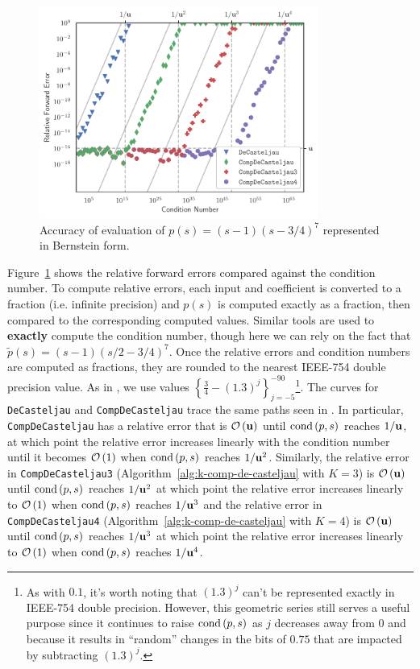 \begin{figure}
  \includegraphics[width=0.8125\textwidth]
                  {../images/k-compensated/de_casteljau_rel_error.pdf}
  \centering
  \captionsetup{width=.75\linewidth}
  \caption{Accuracy of evaluation of \(p(s) = (s - 1)\left(s - 3/4\right)^7\)
    represented in Bernstein form.}
  \label{fig:compensated-k}
\end{figure}

Figure~\ref{fig:compensated-k} shows the relative forward errors compared
against the condition number. To compute relative errors, each input and
coefficient is converted to a fraction (i.e. infinite precision) and
\(p(s)\) is computed exactly as a fraction, then
compared to the corresponding computed values. Similar tools are used to
\textbf{exactly} compute the condition number, though here we can rely
on the fact that \(\widetilde{p}(s) = (s - 1)
\left(s/2 - 3/4\right)^7\). Once the relative errors and
condition numbers are computed as fractions, they are rounded to the
nearest IEEE-754 double precision value. As in \cite{Jiang2010}, we use
values \(\left\{\frac{3}{4} - (1.3)^j\right\}_{j=-5}^{-90}\)\footnote{As with
\(0.1\), it's worth noting that \((1.3)^j\) can't be represented exactly in
IEEE-754 double precision. However, this geometric series still serves a
useful purpose since it continues to raise \(\operatorname{cond}\left(p, s\right)\) as \(j\) decreases
away from \(0\) and because it results in ``random'' changes in the bits of
\(0.75\) that are impacted by subtracting \((1.3)^j\).}. The curves for
\texttt{DeCasteljau} and \texttt{CompDeCasteljau} trace the same paths seen
in \cite{Jiang2010}. In particular, \texttt{CompDeCasteljau} has a relative
error that is \(\mathcal{O}\left(\mathbf{u}\right)\) until \(\operatorname{cond}\left(p, s\right)\) reaches
\(1 / \mathbf{u}\), at which point the relative error increases linearly with
the condition number until it becomes \(\mathcal{O}\left(1\right)\) when
\(\operatorname{cond}\left(p, s\right)\) reaches \(1 / \mathbf{u}^2\).
Similarly, the relative error in \texttt{CompDeCasteljau3}
(Algorithm~\ref{alg:k-comp-de-casteljau} with \(K = 3\))
is \(\mathcal{O}\left(\mathbf{u}\right)\) until \(\operatorname{cond}\left(p, s\right)\) reaches
\(1 / \mathbf{u}^2\) at which point the relative error increases linearly
to \(\mathcal{O}\left(1\right)\) when \(\operatorname{cond}\left(p, s\right)\) reaches \(1 / \mathbf{u}^3\)
and the relative error in \texttt{CompDeCasteljau4}
(Algorithm~\ref{alg:k-comp-de-casteljau} with \(K = 4\))
is \(\mathcal{O}\left(\mathbf{u}\right)\) until \(\operatorname{cond}\left(p, s\right)\) reaches
\(1 / \mathbf{u}^3\) at which point the relative error increases linearly
to \(\mathcal{O}\left(1\right)\) when \(\operatorname{cond}\left(p, s\right)\) reaches \(1 / \mathbf{u}^4\).
